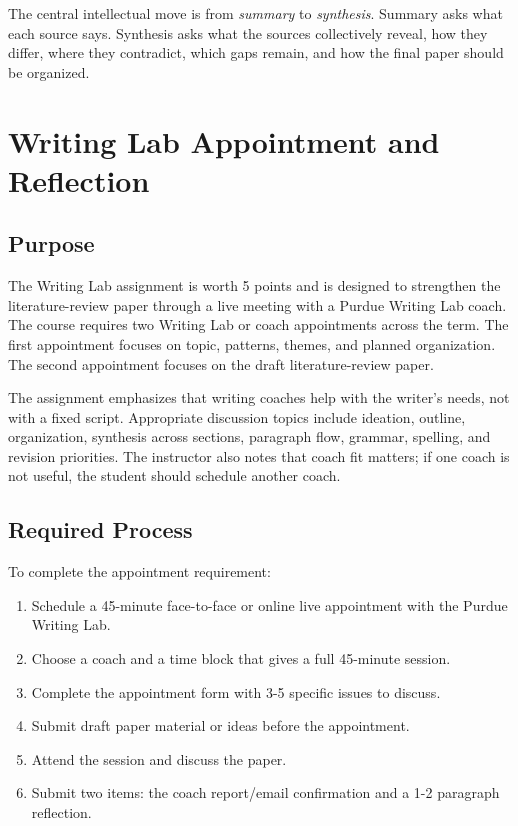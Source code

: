 \documentclass[10pt,letterpaper]{article}
\begin{document}
The central intellectual move is from \emph{summary} to \emph{synthesis}. Summary asks what each source says. Synthesis asks what the sources collectively reveal, how they differ, where they contradict, which gaps remain, and how the final paper should be organized.

\section{Writing Lab Appointment and Reflection}

\subsection{Purpose}

The Writing Lab assignment is worth 5 points and is designed to strengthen the literature-review paper through a live meeting with a Purdue Writing Lab coach. The course requires two Writing Lab or coach appointments across the term. The first appointment focuses on topic, patterns, themes, and planned organization. The second appointment focuses on the draft literature-review paper.

The assignment emphasizes that writing coaches help with the writer's needs, not with a fixed script. Appropriate discussion topics include ideation, outline, organization, synthesis across sections, paragraph flow, grammar, spelling, and revision priorities. The instructor also notes that coach fit matters; if one coach is not useful, the student should schedule another coach.

\subsection{Required Process}

To complete the appointment requirement:

\begin{enumerate}
\item Schedule a 45-minute face-to-face or online live appointment with the Purdue Writing Lab.
\item Choose a coach and a time block that gives a full 45-minute session.
\item Complete the appointment form with 3-5 specific issues to discuss.
\item Submit draft paper material or ideas before the appointment.
\item Attend the session and discuss the paper.
\item Submit two items: the coach report/email confirmation and a 1-2 paragraph reflection.
\end{enumerate}
\end{document}
